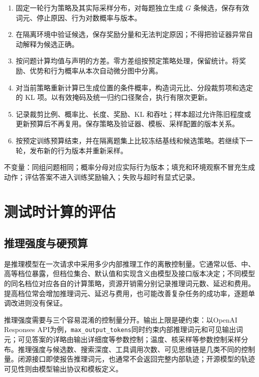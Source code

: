 \documentclass[../textbook.tex]{subfiles}
\begin{document}
\begin{algorithm}[版本化组相对策略更新]
\begin{enumerate}
\item 固定一轮行为策略及其实际采样分布，对每题独立生成 $G$ 条候选，保存有效词元、停止原因、行为对数概率与版本。
\item 在隔离环境中验证候选，保存奖励分量和无法判定原因；不得把验证器异常自动解释为候选正确。
\item 按问题计算均值与声明的方差。零方差组按预定策略处理，保留统计。将奖励、优势和行为概率从本次自动微分图中分离。
\item 对当前策略重新计算已生成位置的条件概率，构造词元比、分段裁剪项和选定的 KL 项。以有效掩码及统一归约口径聚合，执行有限次更新。
\item 记录裁剪比例、概率比、长度、奖励、KL 和吞吐；样本超过允许陈旧程度或更新预算后不再复用。保存策略及验证器、模板、采样配置的版本关系。
\item 按预定训练预算结束，并在隔离题集上比较冻结基线和候选策略。若继续下一轮，发布新的行为版本并重新采样。
\end{enumerate}
不变量：同组问题相同；概率分母对应实际行为版本；填充和环境观察不冒充生成动作；评估答案不进入训练奖励输入；失败与超时有显式记录。
\end{algorithm}

\section{测试时计算的评估}

\subsection{推理强度与硬预算}
是推理模型在一次请求中采用多少内部推理工作的离散控制量。它通常以低、中、高等档位暴露，但档位集合、默认值和实现含义由模型及接口版本决定；不同模型的同名档位对应各自的计算策略，资源开销需分别记录推理词元数、延迟和费用。提高档位常会增加推理词元、延迟与费用，也可能改善复杂任务的成功率，逐题单调改进则没有保证。

推理强度需要与三个容易混淆的控制量分开。输出上限是硬约束：以OpenAI Responses API为例，\texttt{max\_output\_tokens}同时约束内部推理词元和可见输出词元；可见答案的详略由输出详细度等参数控制；温度、核采样等参数控制采样分布。推理强度与候选数、搜索深度、工具调用次数、可见思维链是几类不同的控制量。闭源接口即使报告推理词元，也通常不会返回完整内部轨迹；开源模型的轨迹可见性则由模型输出协议和模板定义。
\end{document}
